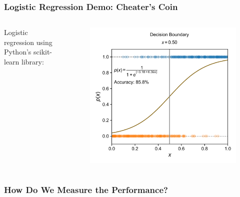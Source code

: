 \documentclass[10pt,aspectratio=169]{beamer}
\begin{document}
      \begin{frame}
        \frametitle{Logistic Regression Demo: Cheater’s Coin}
        \begin{columns}[T]
          \begin{column}{0.5\textwidth}
            Logistic regression using Python's scikit-learn library:
            
            \inputminted[fontsize=\scriptsize]{python}{sample_lr_coin.py}
          \end{column}

          \begin{column}{0.5\textwidth}
            \begin{figure}[t]
              \includegraphics[width=\textwidth]{scripts/coin_fit_lr.pdf}
            \end{figure}
          \end{column}
        \end{columns}
      \end{frame}

      \begin{frame}
        \frametitle{How Do We Measure the Performance?}
        
      \end{frame}
\end{document}
